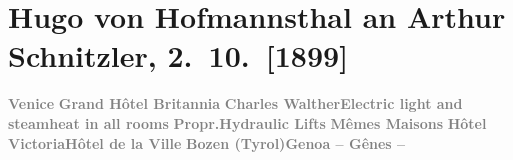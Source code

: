 

         
         \newcommand{\erwaehntePersonen}{Personen: Richard Beer-Hofmann, Otto Brahm}
         \newcommand{\erwaehnteOrte}{Orte: Bad Ischl, Bozen, Genua, Grand Hotel Britannia, Hotel Victoria, Hotel de la Ville, Tirol, Vahrn, Venedig, Wien}
         \newcommand{\erwaehnteWerke}{Werke: Das Bergwerk zu Falun, Der Graf von Charolais. Ein Trauerspiel}
               \section[Hugo von Hofmannsthal an Arthur Schnitzler, 2. 10. {[}1899{]}]{ Hugo von Hofmannsthal an Arthur Schnitzler, 2. 10. {[}1899{]}}\nopagebreak{}\rehead{ }\begin{ledgroupsized}[t]{13cm}\normalsize\beginnumbering \toendnotes[C]{\smallbreak\pagebreak[2]} 
\toendnotes[C]{\smallbreak}\pstart
           \noindent{}\raggedleft{}{\pb}\textcolor{gray}{\textbf{Venice}}\pend
           \pstart
           \noindent{}\centering{}\textcolor{gray}{\textbf{Grand Hôtel
                     Britannia}}\pend
           \pstart
           \noindent{}\textcolor{gray}{\textbf{Charles Walther}}\hfill \textcolor{gray}{\textbf{Electric light and steamheat in all rooms}}\pend
           \pstart
           \textcolor{gray}{\textbf{Propr.}}\hfill \textcolor{gray}{\textbf{Hydraulic Lifts}}\pend
           \pstart
           \centering{}\textcolor{gray}{\textbf{Mêmes Maisons}}\pend
           \pstart
           \noindent{}\textcolor{gray}{\textbf{Hôtel
                        Victoria}}\hfill \textcolor{gray}{\textbf{Hôtel de la Ville}}\pend
           \pstart
           \textcolor{gray}{\textbf{Bozen (Tyrol)}}\hfill \textcolor{gray}{\textbf{Genoa – Gênes –
}}
\end{ledgroupsized}
